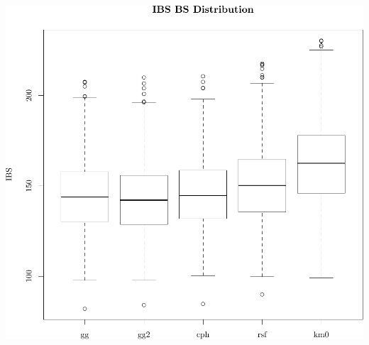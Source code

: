 \documentclass{article}\usepackage[]{graphicx}\usepackage[]{color}
\makeatletter
\def\maxwidth{ %
  \ifdim\Gin@nat@width>\linewidth
    \linewidth
  \else
    \Gin@nat@width
  \fi
}
\newenvironment{knitrout}{}{} %
\makeatother
\begin{document}
\begin{knitrout}
{\centering \includegraphics[width=\maxwidth]{figure/05-model-selection-ibs-1} 

}



\end{knitrout}
\end{document}
